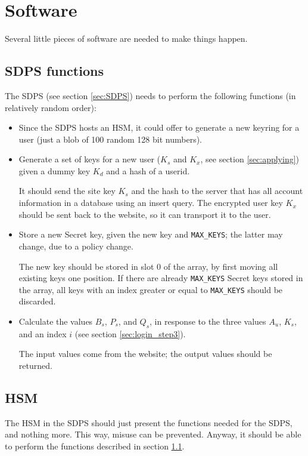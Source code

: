 \section{Software}
Several little pieces of software are needed to make things happen.

\subsection{SDPS functions}
\label{sec:sdps_functions}
The SDPS (see section \ref{sec:SDPS}) needs to perform the following functions (in relatively random order):
\begin{itemize}
\item Since the SDPS hosts an HSM,
it could offer to generate a new keyring for a user
(just a blob of 100 random 128 bit numbers).
\item Generate a set of keys for a new user ($K_s$ and $K_x$,
see section \ref{sec:applying}) given a dummy key $K_d$ and a  hash of a userid.
\par
It should send the site key $K_s$ and the hash to the server that has all account information in a database using an insert query.
The encrypted user key $K_x$ should be sent back to the website, so it can transport it to the user.
\item Store a new Secret key,
given the new key and \texttt{MAX\_KEYS};
the latter may change,
due to a policy change.
\par
The new key should be stored in slot 0 of the array, by first moving all existing keys one position.
If there are already \texttt{MAX\_KEYS} Secret keys stored in the array,
all keys with an index greater or equal to \texttt{MAX\_KEYS} should be discarded.
\item Calculate the values $B_s$, $P_s$, and $Q_s$,
in response to the three values $A_u$, $K_s$,
and an index $i$ (see section \ref{sec:login_step3}).
\par The input values come from the website;
the output values should be returned.
\end{itemize}

\subsection{HSM}
The HSM in the SDPS should just present the functions needed for the SDPS,
and nothing more.
This way,
misuse can be prevented.
Anyway, it should be able to perform the functions described in section \ref{sec:sdps_functions}.

